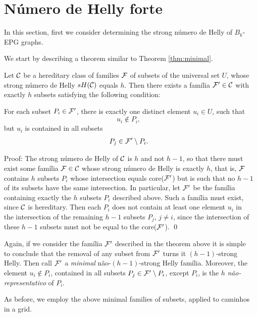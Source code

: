 \section{Número de Helly forte}\label{sec:helly-forte}

In this section, first  we consider determining the strong número de Helly of $B_k$-EPG graphs.

We start by describing a theorem similar to Theorem \ref{thm:minimal}.

\begin{theorem}\label{thm:minimal-strong}

Let ${\cal C}$ be a hereditary class of families $\cal F$ of subsets of the universal set $U$, whose strong número de Helly $sH({\cal C})$ equals $h$. Then there exists a família ${\cal F'} \in {\cal C}$ with exactly $h$ subsets satisfying the following condition: 

For each subset $P_i \in \cal {F'}$, there is exactly one distinct element $u_i \in U$, such that \\
$$u_i \not \in P_i,$$ 
but $u_i$ is contained in all  subsets 
$$P_j \in {\cal F'} \setminus P_i.$$
\end{theorem}

Proof: The strong número de Helly of ${\cal C}$ is $h$ and not $h - 1$, so that  there must exist some família ${\cal F} \in {\cal C}$ whose strong número de Helly is exactly $h$, that is, $\cal F$  contains $h$ subsets $P_i$ whose intersection equals  core($\cal F'$) but is such that no  $h-1$ of its subsets have the same intersection. In particular, let $\cal F'$ be the família containing exactly the $h$ subsets $P_i$ described above. Such a família must exist, since $\cal C$ is hereditary. Then each $P_i$ does not contain at least one element $u_i$ in the intersection of the remaining $h-1$ subsets $P_j$, $j \ne i$, 
since the intersection of these $h-1$ subsets must not be equal to the core($\cal F'$).  \qed

Again, if we consider the família $\cal F'$ described in the theorem above it is simple to conclude that the removal of any subset from $\cal {F'}$ turns it $(h-1)$-strong Helly.  Then call $\cal {F'}$ a {\it minimal} não-$(h-1)$-strong Helly família. Moreover, the element $u_i \not \in P_i$, contained in all subsets $P_j \in {\cal{F'}} \setminus P_i$, except $P_i$, is the {\it $h$ não-representativo} of $P_i$.  

As before, we  employ the above minimal families of subsets, applied to caminhos in a grid.

